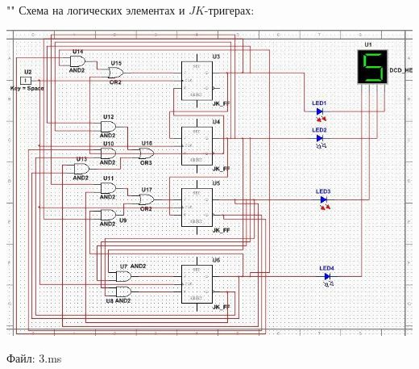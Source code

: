 \documentclass[a4paper,12pt]{article}
\begin{document}
	""\newline\newline
	Схема на логических элементах и $JK$-тригерах:
	
\begin{center}
	\includegraphics[scale=0.58]{../screens/3.jpg}
\end{center}

\noindent Файл: 3.ms
\end{document}
